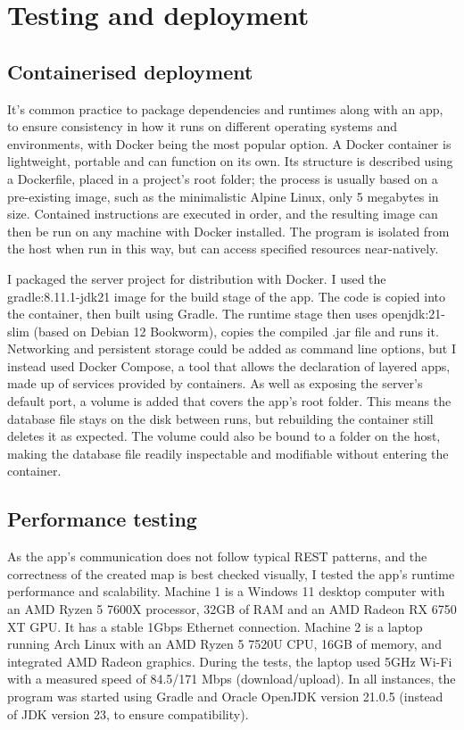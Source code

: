 \chapter{Testing and deployment}

\section{Containerised deployment}
It's common practice to package dependencies and runtimes along with an app, to ensure consistency in how it runs on different operating systems and environments, with Docker being the most popular option. A Docker container is lightweight, portable and can function on its own. Its structure is described using a Dockerfile, placed in a project's root folder; the process is usually based on a pre-existing image, such as the minimalistic Alpine Linux, only 5 megabytes in size. Contained instructions are executed in order, and the resulting image can then be run on any machine with Docker installed. The program is isolated from the host when run in this way, but can access specified resources near-natively.

I packaged the server project for distribution with Docker. I used the gradle:8.11.1-jdk21 image for the build stage of the app. The code is copied into the container, then built using Gradle. The runtime stage then uses openjdk:21-slim (based on Debian 12 Bookworm), copies the compiled .jar file and runs it. Networking and persistent storage could be added as command line options, but I instead used Docker Compose, a tool that allows the declaration of layered apps, made up of services provided by containers. As well as exposing the server's default port, a volume is added that covers the app's root folder. This means the database file stays on the disk between runs, but rebuilding the container still deletes it as expected. The volume could also be bound to a folder on the host, making the database file readily inspectable and modifiable without entering the container.

\section{Performance testing}

As the app's communication does not follow typical REST patterns, and the correctness of the created map is best checked visually, I tested the app's runtime performance and scalability.
Machine 1 is a Windows 11 desktop computer with an AMD Ryzen 5 7600X processor, 32GB of RAM and an AMD Radeon RX 6750 XT GPU. It has a stable 1Gbps Ethernet connection. Machine 2 is a laptop running Arch Linux with an AMD Ryzen 5 7520U CPU, 16GB of memory, and integrated AMD Radeon graphics. During the tests, the laptop used 5GHz Wi-Fi with a measured speed of 84.5/171 Mbps (download/upload). In all instances, the program was started using Gradle and Oracle OpenJDK version 21.0.5 (instead of JDK version 23, to ensure compatibility). 

